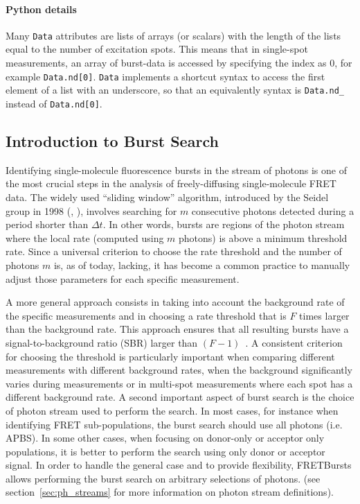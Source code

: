 \paragraph{Python details}
Many \verb|Data| attributes are lists of arrays (or scalars) with the length of the lists
equal to the number of excitation spots. This means that in
single-spot measurements, an array of burst-data
is accessed by specifying the index as 0, for example \verb|Data.nd[0]|.
\verb|Data| implements a shortcut syntax to access the first element of a list
with an underscore, so that an equivalently syntax is
\verb|Data.nd_| instead of \verb|Data.nd[0]|.

\subsection{Introduction to Burst Search}
\label{sec:burstsearch_intro}

Identifying single-molecule fluorescence bursts in the stream of photons is
one of the most crucial steps in the analysis of freely-diffusing single-molecule FRET data.
The widely used ``sliding window'' algorithm, introduced by the Seidel group in 1998
(\cite{Eggeling_1998}, \cite{Fries_1998}), involves searching for
$m$ consecutive photons detected during a period shorter than
$\Delta t$. In other words, bursts are regions of the photon stream where the
local rate (computed using $m$ photons) is above a minimum threshold rate.
Since a universal criterion to choose the rate threshold and
the number of photons $m$ is, as of today, lacking, it has become a common
practice to manually adjust those parameters for each specific measurement.

A more general approach consists in taking into account the background rate of
the specific measurements and in choosing a rate threshold that is $F$ times
larger than the background rate. This approach ensures that all resulting bursts
have a signal-to-background ratio (SBR) larger than
$(F-1)$~\cite{Michalet_2012}. A consistent criterion for choosing the threshold is
particularly important when comparing different measurements with different background
rates, when the background significantly varies during measurements or in
multi-spot measurements where each spot has a different background rate.
A second important aspect of burst search is the choice of photon stream used
to perform the search.
In most cases, for instance when identifying FRET sub-populations,
the burst search should use all photons (i.e. APBS). In some other cases, when focusing on
donor-only or acceptor only populations, it is better to perform the search using
only donor or acceptor signal.
In order to handle the general case and to provide flexibility,
FRETBursts allows performing the burst search on arbitrary selections of photons.
(see section~\ref{sec:ph_streams} for more information on photon stream definitions).

